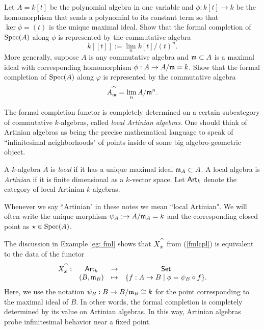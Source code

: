 \documentclass[11pt]{amsart}
\def\Spec{{\rm Spec}}
\begin{document}
\begin{ex}
Let $A = k [t]$ be the polynomial algebra in one variable and $\phi : k[t] \to k$ be the homomorphism that sends a polynomial to its constant term so that $\ker \phi = (t)$ is the unique maximal ideal.
Show that the formal completion of ${\rm Spec}(A)$ along $\phi$ is represented by the commutative algebra
\[
k[[t]] := \lim_{n}  k[t] / (t)^n .
\]
More generally, suppose $A$ is any commutative algebra and $\fm \subset A$ is a maximal ideal with corresponding homomorphism $\phi : A \to A / \fm = k$.
Show that the formal completion of ${\rm Spec}(A)$ along $\varphi$ is represented by the commutative algebra
\[
A^{\Hat{\;\;}}_\fm = \lim_{n} A / \fm^n .
\]
\end{ex}

The formal completion functor is completely determined on a certain subcategory of commutative $k$-algebras, called {\em local Artinian algebras}.
One should think of Artinian algebras as being the precise mathematical language to speak of ``infinitesimal neighborhoods" of points inside of some big algebro-geometric object. 

\begin{dfn}
A $k$-algebra $A$ is {\em local} if it has a unique maximal ideal $\fm_A \subset A$. 
A local algebra is {\em Artinian} if it is finite dimensional as a $k$-vector space.
Let $\Art_k$ denote the category of local Artinian $k$-algebras.
\end{dfn}

\begin{rmk}
Whenever we say ``Artinian" in these notes we mean ``local Artinian".
We will often write the unique morphism $\psi_A : \to A / \fm_A = k$ and the corresponding closed point as $\star \in \Spec(A)$. 
\end{rmk}

The discussion in Example \ref{eg: fml} shows that $X^{\Hat{\;\;}}_x$ from (\ref{fmlcpl}) is equivalent to the data of the functor
\[
\begin{array}{cccc}
X^{\Hat{\;\;}}_x : & \Art_k & \to & \Set \\
& (B,\fm_B) & \mapsto & \{f : A \to B \; | \; \phi = \psi_B \circ f\} . 
\end{array}
\]
Here, we use the notation $\psi_B : B \to B / \fm_B \cong k$ for the point corresponding to the maximal ideal of $B$. 
In other words, the formal completion is completely determined by its value on Artinian algebras. 
In this way, Artinian algebras probe infinitesimal behavior near a fixed point. 
\end{document}
